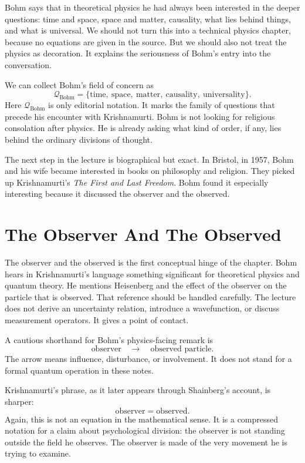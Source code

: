 Bohm says that in theoretical physics he had always been interested in the deeper questions: time and space, space and matter, causality, what lies behind things, and what is universal. We should not turn this into a technical physics chapter, because no equations are given in the source. But we should also not treat the physics as decoration. It explains the seriousness of Bohm's entry into the conversation.

We can collect Bohm's field of concern as
\begin{equation}
\mathcal{Q}_{\mathrm{Bohm}}
=
\{\text{time},\ \text{space},\ \text{matter},\ \text{causality},\ \text{universality}\}.
\end{equation}
Here \(\mathcal{Q}_{\mathrm{Bohm}}\) is only editorial notation. It marks the family of questions that precede his encounter with Krishnamurti. Bohm is not looking for religious consolation after physics. He is already asking what kind of order, if any, lies behind the ordinary divisions of thought.

The next step in the lecture is biographical but exact. In Bristol, in 1957, Bohm and his wife became interested in books on philosophy and religion. They picked up Krishnamurti's \emph{The First and Last Freedom}. Bohm found it especially interesting because it discussed the observer and the observed.

\section{The Observer And The Observed}

The observer and the observed is the first conceptual hinge of the chapter. Bohm hears in Krishnamurti's language something significant for theoretical physics and quantum theory. He mentions Heisenberg and the effect of the observer on the particle that is observed. That reference should be handled carefully. The lecture does not derive an uncertainty relation, introduce a wavefunction, or discuss measurement operators. It gives a point of contact.

A cautious shorthand for Bohm's physics-facing remark is
\begin{equation}
\text{observer}
\quad\longrightarrow\quad
\text{observed particle}.
\end{equation}
The arrow means influence, disturbance, or involvement. It does not stand for a formal quantum operation in these notes.

Krishnamurti's phrase, as it later appears through Shainberg's account, is sharper:
\begin{equation}
\text{observer} = \text{observed}.
\end{equation}
Again, this is not an equation in the mathematical sense. It is a compressed notation for a claim about psychological division: the observer is not standing outside the field he observes. The observer is made of the very movement he is trying to examine.

